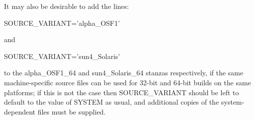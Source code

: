 \documentclass[twoside,11pt,nolof]{starlink}
\newenvironment{squote}{\begin{small}}{\end{small}}
\begin{document}
It may also be desirable to add the lines:
\begin{squote}
\begin{terminalv}
            SOURCE_VARIANT='alpha_OSF1'
\end{terminalv}
\end{squote}
and
\begin{squote}
\begin{terminalv}
            SOURCE_VARIANT='sun4_Solaris'
\end{terminalv}
\end{squote}
to the alpha\_OSF1\_64 and sun4\_Solaris\_64 stanzas respectively,
if the same
machine-specific source files can be used for 32-bit and 64-bit
builds on the same platforms; if this is not the case then SOURCE\_VARIANT
should be left to default to the value of SYSTEM as usual,
and additional copies of the system-dependent files must be supplied.
\end{document}
